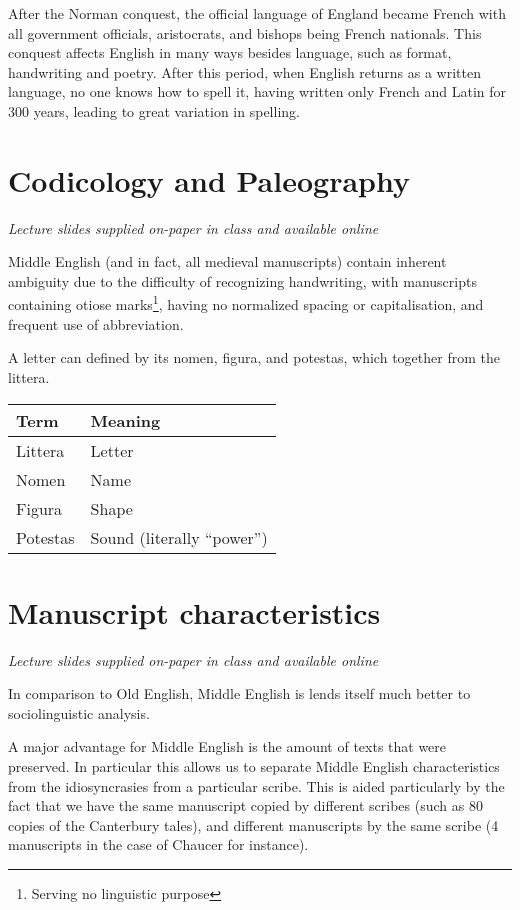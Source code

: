 \documentclass[12pt]{report}
\begin{document}
After the Norman conquest, the official language of England became French with
all government officials, aristocrats, and bishops being French nationals. This
conquest affects English in many ways besides language, such as format,
handwriting and poetry. After this period, when English returns as a written
language, no one knows how to spell it, having written only French and Latin for
300 years, leading to great variation in spelling.

\chapter{Codicology and Paleography}

\textit{Lecture slides supplied on-paper in class and available online}

Middle English (and in fact, all medieval manuscripts) contain inherent
ambiguity due to the difficulty of recognizing handwriting, with manuscripts
containing otiose marks\footnote{Serving no linguistic purpose}, having no
normalized spacing or capitalisation, and frequent use of abbreviation.

A letter can defined by its nomen, figura, and potestas, which together from the
littera.

\begin{tabular}{l|l}
Term & Meaning \\
\hline
	Littera & Letter \\
	Nomen & Name \\
	Figura & Shape \\
	Potestas & Sound (literally ``power'')\\
\end{tabular}

\chapter{Manuscript characteristics}

\textit{Lecture slides supplied on-paper in class and available online}

In comparison to Old English, Middle English is lends itself much better to
sociolinguistic analysis.

A major advantage for Middle English is the amount of
texts that were preserved. In particular this allows us to separate Middle
English characteristics from the idiosyncrasies from a particular scribe. This
is aided particularly by the fact that we have the same manuscript copied by
different scribes (such as 80 copies of the Canterbury tales), and different
manuscripts by the same scribe (4 manuscripts in the case of Chaucer for
instance).
\end{document}
